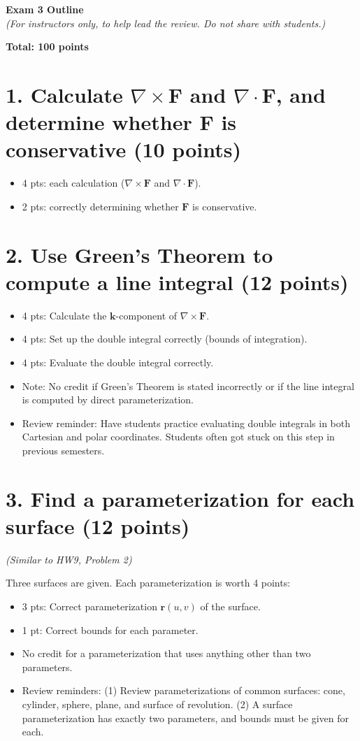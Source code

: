 \documentclass[11pt,letterpaper]{article}
\newcommand{\curl}{\nabla\times}
\newcommand{\dv}{\nabla\cdot}
\renewcommand{\vec}[1]{\mathbf{#1}}
\begin{document}
 
{\LARGE\bfseries Exam 3 Outline}\\[2pt]
\textit{(For instructors only, to help lead the review. Do not share with students.)}
 
\textbf{Total: 100 points}
 
\section*{1. Calculate $\curl\vec F$ and $\dv\vec F$, and determine whether $\vec F$ is conservative (10 points)}
\begin{itemize}
  \item 4 pts: each calculation ($\curl\vec F$ and $\dv\vec F$).
  \item 2 pts: correctly determining whether $\vec F$ is conservative.
\end{itemize}
 
\section*{2. Use Green's Theorem to compute a line integral (12 points)}
\begin{itemize}
  \item 4 pts: Calculate the $\mathbf{k}$-component of $\curl\vec F$.
  \item 4 pts: Set up the double integral correctly (bounds of integration).
  \item 4 pts: Evaluate the double integral correctly.
  \item Note: No credit if Green's Theorem is stated incorrectly or if the line integral is computed by direct parameterization.
  \item Review reminder: Have students practice evaluating double integrals in both Cartesian and polar coordinates. Students often got stuck on this step in previous semesters.
\end{itemize}
 
\section*{3. Find a parameterization for each surface (12 points)}
\textit{(Similar to HW9, Problem 2)}
 
Three surfaces are given. Each parameterization is worth 4 points:
\begin{itemize}
  \item 3 pts: Correct parameterization $\vec r(u,v)$ of the surface.
  \item 1 pt: Correct bounds for each parameter.
  \item No credit for a parameterization that uses anything other than two parameters.
  \item Review reminders: (1) Review parameterizations of common surfaces: cone, cylinder, sphere, plane, and surface of revolution. (2) A surface parameterization has exactly two parameters, and bounds must be given for each.
\end{itemize}
 
\end{document}
